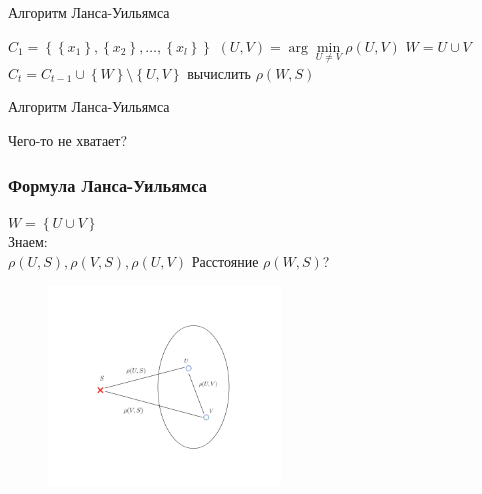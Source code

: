 \documentclass[10pt]{beamer}
\begin{document}
\begin{frame}{Алгоритм Ланса-Уильямса}
	\begin{algorithmic}[1]
            \State ${C_1 = \left\{ \left\{ x_1\right\}, \left\{x_2 \right\}, \dots, \left\{x_l \right\} \right\}}$
            		\State ${(U, V) = \arg\min\limits_{U \neq V} \rho(U, V)}$
            		\State $W = U \cup V$
            		\State ${C_t = C_{t-1} \cup \left\{ W \right\}\setminus \left\{U, V \right\} }$
            			\State вычислить $\rho(W, S)$
            		\EndFor
            	\EndFor
        \EndFunction
    \end{algorithmic}   
\end{frame}
	
\begin{frame}{Алгоритм Ланса-Уильямса}
  \begin{center}
    Чего-то не хватает?  
  \end{center}
\end{frame}

\begin{frame}\frametitle{Формула Ланса-Уильямса}
	\begin{minipage}[t]{0.45\linewidth}
    \vspace{15mm}
 		${ W = \left\{ U \cup V \right\} }$\\	
		\bigbreak		
		\alert{Знаем}:\\
		${\rho(U, S), \rho(V, S), \rho(U, V)}$
		\bigbreak				
		Расстояние $\rho(W, S)$?\\	
	\end{minipage}%
	\begin{minipage}[t]{0.55\linewidth}
	  \begin{figure}[htbp]
	    \includegraphics[height=150pt, keepaspectratio = true]{images/lans-formula}  
	  \end{figure}
  \end{minipage}%
\end{frame}
\end{document}
